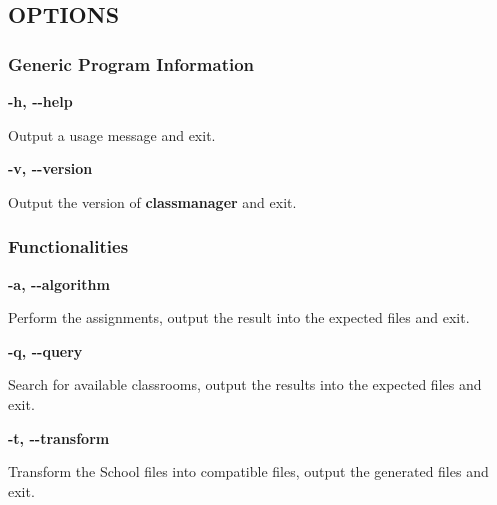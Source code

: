 \subsection*{OPTIONS}

\subsubsection*{Generic Program Information}

\begin{description}
    \item \textbf{-h, -{}-help} 
        \begin{description}
            \item Output a usage message and exit.
        \end{description}
    \item \textbf{-v, -{}-version} 
        \begin{description}
            \item Output the version of \textbf{classmanager} and exit.
        \end{description}
\end{description}

\subsubsection*{Functionalities}

\begin{description}
    \item \textbf{-a, -{}-algorithm} 
        \begin{description}
            \item Perform the assignments, output the result into the expected files and exit.
        \end{description}
    \item \textbf{-q, -{}-query} 
        \begin{description}
            \item Search for available classrooms, output the results into the expected files and exit.
        \end{description}
    \item \textbf{-t, -{}-transform} 
        \begin{description}
            \item Transform the School files into compatible files, output the generated files and exit.
        \end{description}
\end{description}


